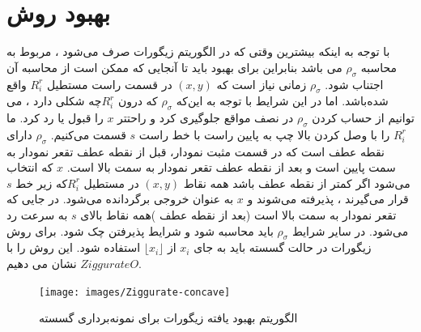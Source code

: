    \section{بهبود روش }   
با توجه به اینکه بیشترین وقتی که در الگوریتم زیگورات صرف می‌شود ، مربوط به محاسبه $\rho _{\sigma}$ می باشد بنابراین برای بهبود باید تا آنجایی که ممکن است از محاسبه آن اجتناب شود. $\rho _{\sigma}$ زمانی نیاز است که $(x,y)$ در قسمت راست مستطیل $R^{r} _{i}$ واقع شده‌باشد. اما در این شرایط با توجه به این‌که $\rho _{\sigma}$  که درون $R^{r} _{i}$چه شکلی دارد ، می توانیم از حساب کردن $\rho _{\sigma}$ در نصف مواقع جلوگیری کرد و راحتتر $x$ را قبول یا رد کرد.
ما $R^{r} _{i}$ را با وصل کردن بالا چپ به پایین راست با خط راست $s$ قسمت می‌کنیم. $\rho _{\sigma}$   دارای نقطه عطف است که در قسمت مثبت نمودار، قبل از نقطه عطف تقعر نمودار به سمت پایین است و بعد از نقطه عطف تقعر نمودار به سمت بالا است.   $x$ که انتخاب می‌شود اگر کمتر از نقطه عطف باشد همه نقاط $(x,y)$ در مستطیل $R^{r} _{i}$که زیر خط $s$ قرار می‌گیرند ، پذیرفته می‌شوند و $x$ به عنوان خروجی برگردانده می‌شود. در جایی که تقعر نمودار به سمت بالا است (بعد از نقطه عطف )همه نقاط بالای $s$ به سرعت رد می‌شود. در سایر شرایط $\rho _{\sigma}$ باید محاسبه شود و شرایط پذیرفتن چک شود. برای روش زیگورات در حالت گسسته باید به جای $x_{i}$ از $\lfloor x_{i}\rfloor $ استفاده شود. این روش را با $ZiggurateO$  نشان می دهیم.\cite{510}
    \begin{figure}[!htb]
      	\texttt{[image: images/Ziggurate-concave]}
      	\caption{الگوریتم  بهبود یافته زیگورات برای نمونه‌برداری گسسته}\label{fig:logtonemap}
      	\endminipage\hfill

      \end{figure}
      


